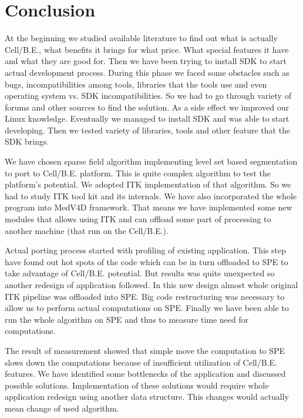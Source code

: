 \chapter{Conclusion}

\par
At the beginning we studied available literature to find out what is actually Cell/B.E., what benefits it brings for what price.
What special features it have and what they are good for.
Then we have been trying to install SDK to start actual development process.
During this phase we faced some obstacles such as bugs, incompatibilities among tools, libraries that the tools use and even operating system vs. SDK incompatibilities.
So we had to go through variety of forums and other sources to find the solution.
As a side effect we improved our Linux knowledge.
Eventually we managed to install SDK and was able to start developing.
Then we tested variety of libraries, tools and other feature that the SDK brings.

\par
We have chosen sparse field algorithm implementing level set based segmentation to port to Cell/B.E. platform.
This is quite complex algorithm to test the platform's potential.
We adopted ITK implementation of that algorithm.
So we had to study ITK tool kit and its internals.
We have also incorporated the whole program into MedV4D framework.
That means we have implemented some new modules that allows using ITK and can offload some part of processing to another machine (that run on the Cell/B.E.).

\par
Actual porting process started with profiling of existing application.
This step have found out hot spots of the code which can be in turn offloaded to SPE to take advantage of Cell/B.E. potential.
But results was quite unexpected so another redesign of application followed.
In this new design almost whole original ITK pipeline was offloaded into SPE.
Big code restructuring was necessary to allow us to perform actual computations on SPE.
Finally we have been able to run the whole algorithm on SPE and thus to measure time need for computations.

\par
The result of measurement showed that simple move the computation to SPE slows down the computations because of insufficient utilization of Cell/B.E. features.
We have identified some bottlenecks of the application and discussed possible solutions.
Implementation of these solutions would require whole application redesign using another data structure.
This changes would actually mean change of used algorithm.

